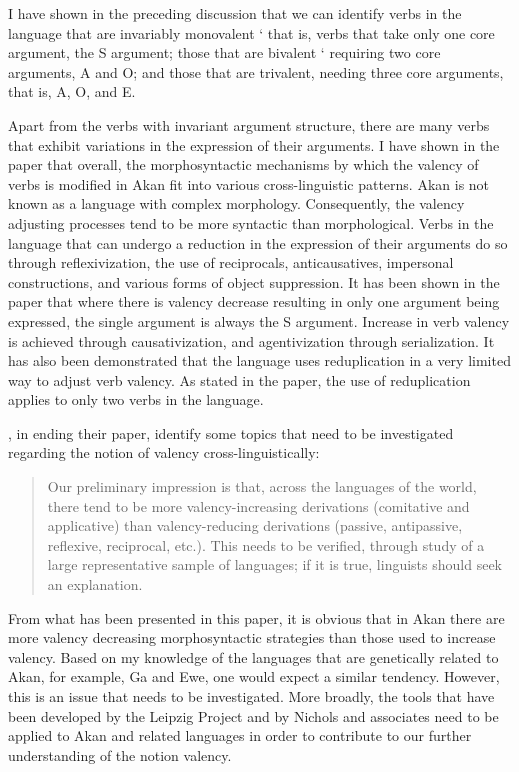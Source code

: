 \documentclass[output=paper]{langsci/langscibook}
\begin{document}
I have shown in the preceding discussion that we can identify verbs in the language that are invariably monovalent ` that is, verbs that take only one core argument, the S argument; those that are bivalent ` requiring two core arguments, A and O; and those that are trivalent, needing three core arguments, that is, A, O, and E.

Apart from the verbs with invariant argument structure, there are many verbs that exhibit variations in the expression of their arguments. I have shown in the paper that overall, the morphosyntactic mechanisms by which the valency of verbs is modified in Akan fit into various cross-linguistic patterns. Akan is not known as a language with complex morphology. Consequently, the valency adjusting processes tend to be more syntactic than morphological. Verbs in the language that can undergo a reduction in the expression of their arguments do so through reflexivization, the use of reciprocals, anticausatives, impersonal constructions, and various forms of object suppression. It has been shown in the paper that where there is valency decrease resulting in only one argument being expressed, the single argument is always the S argument.  Increase in verb valency is achieved through causativization, and agentivization through serialization. It has also been demonstrated that the language uses reduplication in a very limited way to adjust verb valency. As stated in the paper, the use of reduplication applies to only two verbs in the language.

\citet[25-27]{dixonaikhenvald2000b}, in ending their paper, identify some topics that need to be investigated regarding the notion of valency cross-linguistically:

\begin{quote}
Our preliminary impression is that, across the languages of the world, there tend to be more valency-increasing derivations (comitative and applicative) than valency-reducing derivations (passive, antipassive, reflexive, reciprocal, etc.). This needs to be verified, through study of a large representative sample of languages; if it is true, linguists should seek an explanation. \citep[26]{dixonaikhenvald2000b}  
\end{quote}

From what has been presented in this paper, it is obvious that in Akan there are more valency decreasing morphosyntactic strategies than those used to increase valency. Based on my knowledge of the languages that are genetically related to Akan, for example, Ga and Ewe, one would expect a similar tendency. However, this is an issue that needs to be investigated. More broadly, the tools that have been developed by the Leipzig Project and by Nichols and associates need to be applied to Akan and related languages in order to contribute to our further understanding of the notion valency.
\end{document}

